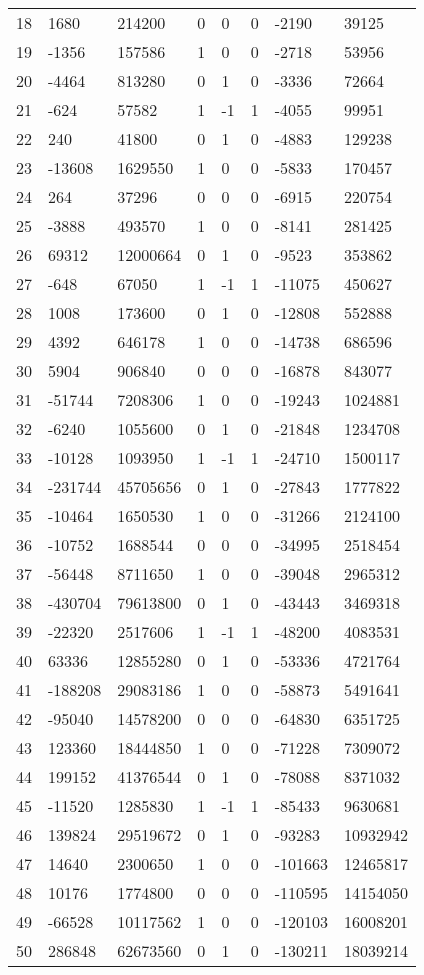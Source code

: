 \documentclass{amsart}
\begin{document}
\begin{longtable}{|l|l|l|lllll|}
18&1680&214200&0&0&0&-2190&39125\\
19&-1356&157586&1&0&0&-2718&53956\\
20&-4464&813280&0&1&0&-3336&72664\\
21&-624&57582&1&-1&1&-4055&99951\\
22&240&41800&0&1&0&-4883&129238\\
23&-13608&1629550&1&0&0&-5833&170457\\
24&264&37296&0&0&0&-6915&220754\\
25&-3888&493570&1&0&0&-8141&281425\\
26&69312&12000664&0&1&0&-9523&353862\\
27&-648&67050&1&-1&1&-11075&450627\\
28&1008&173600&0&1&0&-12808&552888\\
29&4392&646178&1&0&0&-14738&686596\\
30&5904&906840&0&0&0&-16878&843077\\
31&-51744&7208306&1&0&0&-19243&1024881\\
32&-6240&1055600&0&1&0&-21848&1234708\\
33&-10128&1093950&1&-1&1&-24710&1500117\\
34&-231744&45705656&0&1&0&-27843&1777822\\
35&-10464&1650530&1&0&0&-31266&2124100\\
36&-10752&1688544&0&0&0&-34995&2518454\\
37&-56448&8711650&1&0&0&-39048&2965312\\
38&-430704&79613800&0&1&0&-43443&3469318\\
39&-22320&2517606&1&-1&1&-48200&4083531\\
40&63336&12855280&0&1&0&-53336&4721764\\
41&-188208&29083186&1&0&0&-58873&5491641\\
42&-95040&14578200&0&0&0&-64830&6351725\\
43&123360&18444850&1&0&0&-71228&7309072\\
44&199152&41376544&0&1&0&-78088&8371032\\
45&-11520&1285830&1&-1&1&-85433&9630681\\
46&139824&29519672&0&1&0&-93283&10932942\\
47&14640&2300650&1&0&0&-101663&12465817\\
48&10176&1774800&0&0&0&-110595&14154050\\
49&-66528&10117562&1&0&0&-120103&16008201\\
50&286848&62673560&0&1&0&-130211&18039214\\
\hline
\end{longtable}
\end{document}
